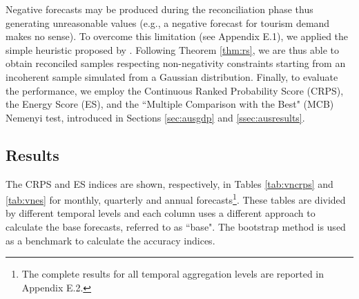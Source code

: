 \documentclass[a4paper,11pt]{article}
\theoremstyle{definition}
\begin{document}
Negative forecasts may be produced during the reconciliation phase \citep{wickramasuriya2020, difonzo2022a, difonzo2023a} thus generating unreasonable values (e.g., a negative forecast for tourism demand makes no sense). To overcome this limitation (see Appendix E.1), we applied the simple heuristic proposed by \cite{difonzo2022b, difonzo2023a}. Following Theorem \ref{thm:rs}, we are thus able to obtain reconciled samples respecting non-negativity constraints starting from an incoherent sample simulated from a Gaussian distribution. Finally, to evaluate the performance, we employ the Continuous Ranked Probability Score (CRPS), the Energy Score (ES), and the “Multiple Comparison with the Best" (MCB) Nemenyi test, introduced in Sections \ref{sec:ausgdp} and \ref{ssec:ausresults}. 

\subsection{Results}

The CRPS and ES indices are shown, respectively, in Tables \ref{tab:vncrps} and \ref{tab:vnes} for monthly, quarterly and annual forecasts\footnote{The complete results for all temporal aggregation levels are reported in Appendix E.2.}. These tables are divided by different temporal levels and each column uses a different approach to calculate the base forecasts, referred to as “base". The bootstrap method is used as a benchmark to calculate the accuracy indices.

\begin{table}[!tb]
	\centering
	\begingroup
	\fontsize{9}{10}\selectfont
	
	\endgroup
	\caption{$\overline{RelCRPS}$ defined in \eqref{eq:skill} and \eqref{eq:skill_all} for the Australian Tourism Demand dataset. %
	Approaches performing worse than the benchmark (bootstrap base forecasts, ctjb) are highlighted in red, the best for each column is marked in bold, and the overall lowest value is highlighted in blue. The reconciliation approaches are described in \autoref{tab:notation}.}
	\label{tab:vncrps}
\end{table}

\begin{table}[!tb]
	\centering
	\begingroup
	\fontsize{9}{10}\selectfont
	
	\endgroup
	\caption{ES ratio indices defined in \eqref{eq:skill} and \eqref{eq:skill_all} for the Australian Tourism Demand dataset. %
	Approaches performing worse than the benchmark (bootstrap base forecasts, ctjb) are highlighted in red, the best for each column is marked in bold, and the overall lowest value is highlighted in blue. The reconciliation approaches are described in \autoref{tab:notation}.}
	\label{tab:vnes}
	\vspace*{-0.35\baselineskip}
\end{table}
\end{document}
